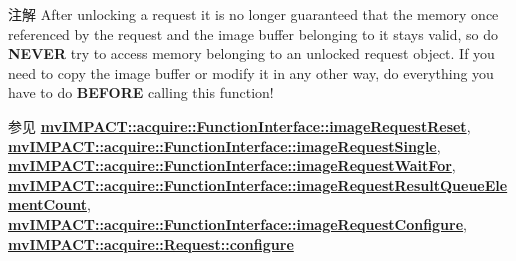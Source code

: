 \begin{DoxyNote}{注解}
After unlocking a request it is no longer guaranteed that the memory once referenced by the request and the image buffer belonging to it stays valid, so do {\bfseries N\+E\+V\+E\+R} try to access memory belonging to an unlocked request object. If you need to copy the image buffer or modify it in any other way, do everything you have to do {\bfseries B\+E\+F\+O\+R\+E} calling this function!
\end{DoxyNote}
\begin{DoxySeeAlso}{参见}
{\bfseries \hyperlink{classmv_i_m_p_a_c_t_1_1acquire_1_1_function_interface_a234b2c6e31f3e83629501da47095c54f}{mv\+I\+M\+P\+A\+C\+T\+::acquire\+::\+Function\+Interface\+::image\+Request\+Reset}}, ~\newline
 {\bfseries \hyperlink{classmv_i_m_p_a_c_t_1_1acquire_1_1_function_interface_a59571120b5e81c3af596ea5da5dc63ba}{mv\+I\+M\+P\+A\+C\+T\+::acquire\+::\+Function\+Interface\+::image\+Request\+Single}}, ~\newline
 {\bfseries \hyperlink{classmv_i_m_p_a_c_t_1_1acquire_1_1_function_interface_a4cefdfda8e8940736ae9a4c97b6de8c9}{mv\+I\+M\+P\+A\+C\+T\+::acquire\+::\+Function\+Interface\+::image\+Request\+Wait\+For}}, ~\newline
 {\bfseries \hyperlink{classmv_i_m_p_a_c_t_1_1acquire_1_1_function_interface_a7e608625f2db03327c3fe9964967d0bc}{mv\+I\+M\+P\+A\+C\+T\+::acquire\+::\+Function\+Interface\+::image\+Request\+Result\+Queue\+Element\+Count}}, ~\newline
 {\bfseries \hyperlink{classmv_i_m_p_a_c_t_1_1acquire_1_1_function_interface_a05594ac5b54679152d27ac0e73b3908e}{mv\+I\+M\+P\+A\+C\+T\+::acquire\+::\+Function\+Interface\+::image\+Request\+Configure}}, ~\newline
 {\bfseries \hyperlink{classmv_i_m_p_a_c_t_1_1acquire_1_1_request_a5ad02aed16acd60699f3d8757c63af43}{mv\+I\+M\+P\+A\+C\+T\+::acquire\+::\+Request\+::configure}} 
\end{DoxySeeAlso}
